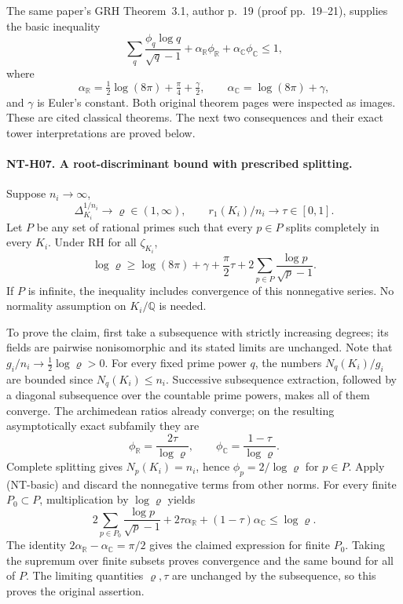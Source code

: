\documentclass[11pt,a4paper]{article}
\begin{document}
The same paper's GRH Theorem~3.1, author p.~19 (proof pp.~19--21),
supplies the basic inequality
\[
 \sum_q\frac{\phi_q\log q}{\sqrt q-1}
 +\alpha_{\mathbb R}\phi_{\mathbb R}
 +\alpha_{\mathbb C}\phi_{\mathbb C}\le1,
\tag{NT-basic}
\]
where
\[
 \alpha_{\mathbb R}=\tfrac12\log(8\pi)+\tfrac\pi4+\tfrac\gamma2,
 \qquad
 \alpha_{\mathbb C}=\log(8\pi)+\gamma,
\]
and $\gamma$ is Euler's constant.  Both original theorem pages were
inspected as images.  These are cited classical theorems.  The next
two consequences and their exact tower interpretations are proved below.

\paragraph{NT-H07. A root-discriminant bound with prescribed splitting.}
Suppose $n_i\to\infty$,
\[
 \Delta_{K_i}^{1/n_i}\longrightarrow\varrho\in(1,\infty),
 \qquad r_1(K_i)/n_i\longrightarrow\tau\in[0,1].
\]
Let $P$ be any set of rational primes such that every $p\in P$ splits
completely in every $K_i$.  Under RH for all $\zeta_{K_i}$,
\[
 \log\varrho\ge\log(8\pi)+\gamma+\frac\pi2\tau
          +2\sum_{p\in P}\frac{\log p}{\sqrt p-1}.
\tag{NT-H07}
\]
If $P$ is infinite, the inequality includes convergence of this
nonnegative series.  No normality assumption on $K_i/\mathbb Q$ is
needed.

To prove the claim, first take a subsequence with strictly increasing
degrees; its fields are pairwise nonisomorphic and its stated limits
are unchanged.  Note that
$g_i/n_i\to\tfrac12\log\varrho>0$.
For every fixed prime power $q$, the numbers $N_q(K_i)/g_i$ are
bounded since $N_q(K_i)\le n_i$.  Successive subsequence extraction,
followed by a diagonal subsequence over the countable prime powers,
makes all of them converge.  The archimedean ratios already converge;
on the resulting asymptotically exact subfamily they are
\[
 \phi_{\mathbb R}=\frac{2\tau}{\log\varrho},\qquad
 \phi_{\mathbb C}=\frac{1-\tau}{\log\varrho}.
\]
Complete splitting gives $N_p(K_i)=n_i$, hence
$\phi_p=2/\log\varrho$ for $p\in P$.
Apply (NT-basic) and discard the nonnegative terms from other norms.
For every finite $P_0\subset P$, multiplication by $\log\varrho$
yields
\[
 2\sum_{p\in P_0}\frac{\log p}{\sqrt p-1}
 +2\tau\alpha_{\mathbb R}+(1-\tau)\alpha_{\mathbb C}
 \le\log\varrho.
\]
The identity
$2\alpha_{\mathbb R}-\alpha_{\mathbb C}=\pi/2$
gives the claimed expression for finite $P_0$.  Taking the supremum
over finite subsets proves convergence and the same bound for all of
$P$.  The limiting quantities $\varrho,\tau$ are unchanged by the
subsequence, so this proves the original assertion.
\end{document}
